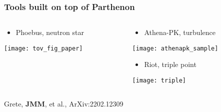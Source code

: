 \documentclass[]{beamer}
\begin{document}
\begin{frame}
  \frametitle{Tools built on top of Parthenon}
  \begin{columns}
    \begin{column}{6cm}
      \begin{itemize}
      \item Phoebus, neutron star
      \end{itemize}
      \begin{center}
        \texttt{[image: tov\_fig\_paper]}
      \end{center}
    \end{column}
    \begin{column}{6cm}
      \begin{itemize}
      \item Athena-PK, turbulence
      \end{itemize}
      \begin{center}
        \texttt{[image: athenapk\_sample]}
      \end{center}
        \begin{itemize}
        \item Riot, triple point
        \end{itemize}
        \begin{center}
          \texttt{[image: triple]}
        \end{center}
    \end{column}
  \end{columns}
  {\footnotesize Grete, \textbf{JMM}, et al., ArXiv:2202.12309}
\end{frame}
\end{document}
